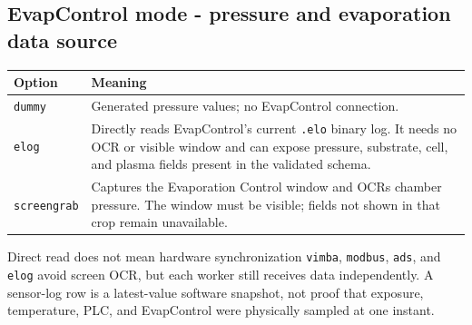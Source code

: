 \documentclass[10pt,a4paper]{article}
\begin{document}
\subsection{EvapControl mode - pressure and evaporation data source}
\begin{tabularx}{\linewidth}{L{34mm}Y}
\toprule
\textbf{Option} & \textbf{Meaning} \\
\midrule
\texttt{dummy} & Generated pressure values; no EvapControl connection. \\
\texttt{elog} & Directly reads EvapControl's current \texttt{.elo} binary log. It needs no OCR or visible window and can expose pressure, substrate, cell, and plasma fields present in the validated schema. \\
\texttt{screengrab} & Captures the Evaporation Control window and OCRs chamber pressure. The window must be visible; fields not shown in that crop remain unavailable. \\
\bottomrule
\end{tabularx}
\normalsize

\begin{warnbox}{Direct read does not mean hardware synchronization}
\texttt{vimba}, \texttt{modbus}, \texttt{ads}, and \texttt{elog} avoid screen OCR, but each worker still receives data independently. A sensor-log row is a latest-value software snapshot, not proof that exposure, temperature, PLC, and EvapControl were physically sampled at one instant.
\end{warnbox}
\end{document}
